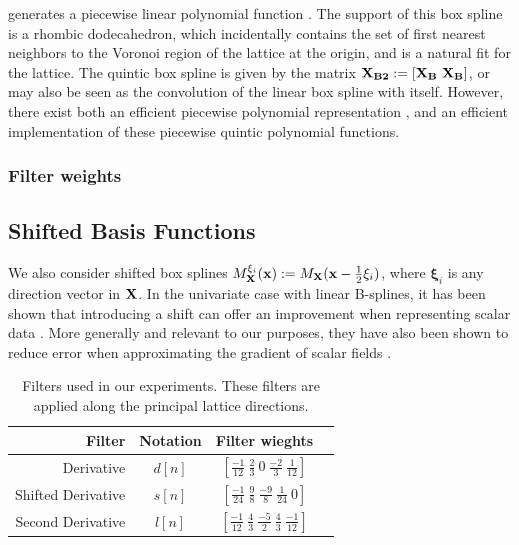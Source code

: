 generates a piecewise linear polynomial function \cite{practicalbox}. The support of this box spline is a rhombic dodecahedron, which incidentally contains the set of first nearest neighbors to the Voronoi region of the lattice at the origin, and is a natural fit for the lattice. The quintic box spline is given by the matrix $\mathbf{\mathbf{X}_{B2}} := \left[\mathbf{\mathbf{X}_{B}} \ \mathbf{\mathbf{X}_{B}}\right]$, or may also be seen as the convolution of the linear box spline with itself.  However, there exist both an efficient piecewise polynomial representation \cite{practicalbox}, and an efficient implementation \cite{fastbox} of these piecewise quintic polynomial functions.

\subsubsection{Filter weights}


\subsection{Shifted Basis Functions}
We also consider shifted box splines $M_{\mathbf{\mathbf{X}}}^{\xi_i}(\mathbf{x}) := M_{\mathbf{\mathbf{X}}}(\mathbf{x} - \frac{1}{2}\mathbf{\xi}_i)$, where $\mathbf{\xi}_i$ is any direction vector in $\mathbf{\mathbf{X}}$. In the univariate case with linear B-splines, it has been shown that introducing a shift can offer an improvement when representing scalar data \cite{linearrev}. More generally and relevant to our purposes, they have also been shown to reduce error when approximating the gradient of scalar fields \cite{gradrev}.

\begin{table}[!t]
	\renewcommand{\arraystretch}{1.5}
	\centering
	\begin{tabular}{|r||c||c|c|}
		\hline
		Filter & Notation & Filter wieghts  \\
		\hline
		\hline
		Derivative & $d[n]$ & $[\frac{-1}{12} \ \frac{2}{3} \ 0 \ \frac{-2}{3} \ \frac{1}{12}]$ \\
		\hline
		Shifted Derivative & $s[n]$  & $[\frac{-1}{24} \ \frac{9}{8} \ \frac{-9}{8} \ \frac{1}{24} \ 0]$ \\
		\hline
		Second Derivative & $l[n]$  & $[\frac{-1}{12} \ \frac{4}{3} \ \frac{-5}{2} \ \frac{4}{3} \ \frac{-1}{12}]$ \\
		\hline
	\end{tabular}
	\caption{Filters used in our experiments. These filters are applied along the principal lattice directions.}
	\label{tab:filters}
\end{table}

